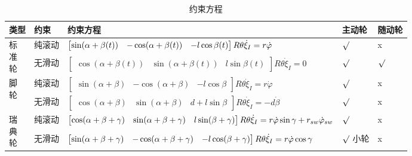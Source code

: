 \documentclass[
12pt, %
a4paper, 
oneside, %
headinclude,footinclude, %
]{scrartcl}
\begin{document}
\begin{table}[H]
\centering
\begin{tabular}{|p{0.9cm}|p{1.3cm}|p{10cm}|p{1.4cm}|p{1.3cm}|}
\hline
类型 & 约束 & 约束方程 & 主动轮 & 随动轮 \\
\hline
\multirow{2}{*}{\parbox[c]{0.9cm}{标\\准\\轮}} & 纯滚动 & $ \begin{bmatrix} \sin(\alpha + \beta(t)) & -\cos(\alpha + \beta(t)) & -l\cos\beta(t) \end{bmatrix} R\theta \dot{\xi}_I \newline = r\dot{\varphi} $ & $ \surd $ & x \\
\cline{2-5}
& 无滑动 & $ \begin{bmatrix} \cos(\alpha + \beta(t)) & \sin(\alpha + \beta(t)) & l\sin\beta(t) \end{bmatrix} R\theta \dot{\xi}_I = 0 $ & $ \surd $ & $ \surd $ \\
\hline
\multirow{2}{*}{\parbox[c]{0.9cm}{脚\\轮}} & 纯滚动 & $ \begin{bmatrix} \sin(\alpha + \beta) & -\cos(\alpha + \beta) & -l\cos\beta \end{bmatrix} R\theta \dot{\xi}_I = r\dot{\varphi} $ & $ \surd $ & x \\
\cline{2-5}
& 无滑动 & $ \begin{bmatrix} \cos(\alpha + \beta) & \sin(\alpha + \beta) & d + l\sin\beta \end{bmatrix} R\theta \dot{\xi}_I = -d\dot{\beta} $ & $ \surd $ & x \\
\hline
\multirow{2}{*}{\parbox[c]{0.9cm}{瑞\\典\\轮}} & 纯滚动 & $ \begin{bmatrix} \cos(\alpha + \beta + \gamma) & \sin(\alpha + \beta + \gamma) & l\sin(\beta + \gamma) \end{bmatrix} R\theta \dot{\xi}_I \newline = r\dot{\varphi}\sin\gamma + r_{sw}\dot{\varphi}_{sw} $ & $ \surd $ & x \\
\cline{2-5}
& 无滑动 & $ \begin{bmatrix} \sin(\alpha + \beta + \gamma) & -\cos(\alpha + \beta + \gamma) & -l\cos(\beta + \gamma) \end{bmatrix} R\theta \dot{\xi}_I \newline = r\dot{\varphi}\cos\gamma $ & $ \surd $ \newline 小轮 & x \\
\hline
\end{tabular}
\caption{约束方程}
\end{table}
\end{document}
